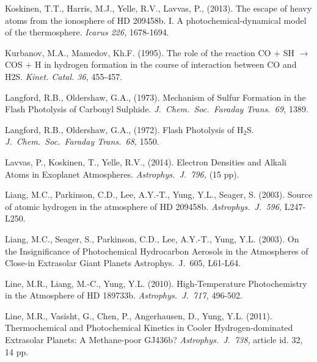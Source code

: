 \documentclass[preprint]{aastex}
\newcounter{reaction}
\begin{document}
\begin{thebibliography}{00}
Koskinen, T.T., Harris, M.J., Yelle, R.V., Lavvas, P., (2013).
The escape of heavy atoms from the ionosphere of HD 209458b. I. A photochemical-dynamical model of the thermosphere.
{\em Icarus 226,} 1678-1694.

Kurbanov, M.A., Mamedov, Kh.F.  (1995). The role of the reaction CO + SH $\rightarrow$ COS + H in hydrogen formation in the course of interaction between CO and H2S.  {\em Kinet. Catal.  36,} 455-457.

Langford, R.B., Oldershaw, G.A., (1973).
Mechanism of Sulfur Formation in the Flash Photolysis of Carbonyl Sulphide.
{\em J.\ Chem.\ Soc.\ Faraday Trans.\ 69,} 1389.

Langford, R.B., Oldershaw, G.A., (1972).
Flash Photolysis of H$_2$S.
{\em J.\ Chem.\ Soc.\ Faraday Trans.\ 68,} 1550.

Lavvas, P., Koskinen, T., Yelle, R.V., (2014).
Electron Densities and Alkali Atoms in Exoplanet Atmospheres.
{\em Astrophys.\ J.\ 796,} (15 pp).


Liang, M.C., Parkinson, C.D., Lee, A.Y.-T., Yung, Y.L., Seager, S. (2003).
Source of atomic hydrogen in the atmosphere of HD 209458b.
{\em Astrophys.\ J.\ 596,} L247-L250.

Liang, M.C., Seager, S., Parkinson, C.D., Lee, A.Y.-T., Yung, Y.L. (2003).
On the Insignificance of Photochemical Hydrocarbon Aerosols in the Atmospheres of Close-in Extrasolar Giant Planets
Astrophys.\ J.\ 605, L61-L64.

 Line, M.R., Liang, M.-C., Yung, Y.L. (2010). 
 High-Temperature Photochemistry in the Atmosphere of HD 189733b.
  {\em Astrophys.\ J.\ 717,} 496-502.

Line, M.R., Vasisht, G., Chen, P., Angerhausen, D., Yung, Y.L. (2011).
Thermochemical and Photochemical Kinetics in Cooler Hydrogen-dominated Extrasolar Planets: A Methane-poor GJ436b? 
{\em  Astrophys.\ J.\ 738,} article id. 32, 14 pp.


\end{thebibliography}
\end{document}
